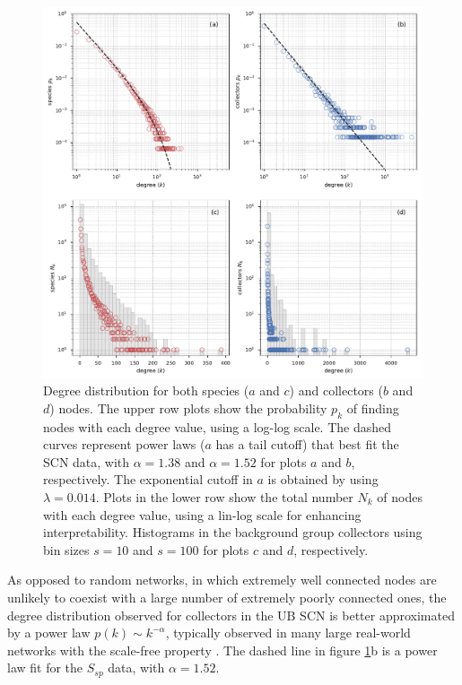   \begin{figure}[t]
  	\centering
    \includegraphics[width=\linewidth]{figures/casestudy_ub/scn_degree_dist}
    \caption{Degree distribution for both species ($a$ and $c$) and collectors ($b$ and $d$) nodes. The upper row plots show the probability $p_k$ of finding nodes with each degree value, using a log-log scale. The dashed curves represent power laws ($a$ has a tail cutoff) that best fit the SCN data, with $\alpha=1.38$ and $\alpha=1.52$ for plots $a$ and $b$, respectively. The exponential cutoff in $a$ is obtained by using $\lambda=0.014$. Plots in the lower row show the total number $N_k$ of nodes with each degree value, using a lin-log scale for enhancing interpretability. Histograms in the background group collectors using bin sizes $s=10$ and $s=100$ for plots $c$ and $d$, respectively.}
    \label{fig:ub_scn_degree_dist}
  \end{figure}

As opposed to random networks, in which extremely well connected nodes are unlikely to coexist with a large number of extremely poorly connected ones, the degree distribution observed for collectors in the UB SCN is better approximated by a power law $p(k) \sim k^{-\alpha}$, typically observed in many large real-world networks with the scale-free property \cite{Barabasi1999a}. The dashed line in figure \ref{fig:ub_scn_degree_dist}b is a power law fit for the $S_{sp}$ data, with $\alpha=1.52$. 


